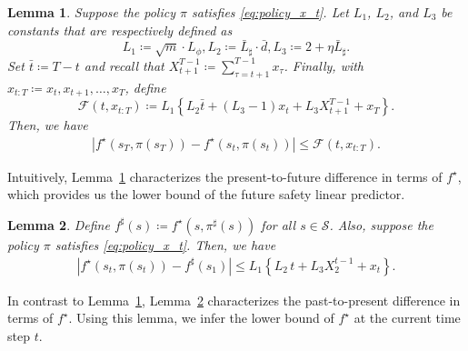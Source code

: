 \documentclass[letterpaper]{article} %
\newtheorem{lemma}
{Lemma}
\newcommand{\cS}{\mathcal{S}}
\newcommand{\abs}[1]{\left|{#1}\right|}
\begin{document}
\begin{lemma}
    \label{lemma:f_t_T}
    Suppose the policy $\pi$ satisfies \eqref{eq:policy_x_t}.
    Let $L_1$, $L_2$, and $L_3$ be constants that are respectively defined as 
    \[
        L_1 \coloneqq \sqrt{m} \cdot L_\phi, L_2 \coloneqq \bar{L}_\sharp \cdot \bar{d}, L_3 \coloneqq 2 + \eta \bar{L}_\sharp.
    \]
    Set $\bar{t} \coloneqq T - t$ and
    recall that $X_{t+1}^{T-1} \coloneqq \sum_{\tau=t+1}^{T-1} x_\tau$.
    Finally, with $x_{t:T} \coloneqq x_t, x_{t+1}, \ldots, x_T$, define
    \begin{equation*}
        \mathcal{F}(t, x_{t:T}) \coloneqq L_1 \left\{L_2 \bar{t} + (L_3-1) x_t + L_3 X_{t+1}^{T-1} + x_{T} \right\}.
    \end{equation*}
    Then, we have
    \begin{align*}
        \abs{f^\star(s_T, \pi(s_T)) - f^\star(s_t, \pi(s_t))}
        \le \mathcal{F}(t, x_{t:T}).
    \end{align*}
\end{lemma}
%
\noindent
Intuitively, Lemma~\ref{lemma:f_t_T} characterizes the present-to-future difference in terms of $f^\star$, which provides us the lower bound of the future safety linear predictor.
%
\begin{lemma}
    \label{lemma:f_1_t}
    Define $f^\sharp(s) \coloneqq f^\star(s, \pi^\sharp(s))$ for all $s \in \cS$.
    Also, suppose the policy $\pi$ satisfies \eqref{eq:policy_x_t}.
    Then, we have
    \begin{align*}
        \abs{f^\star(s_t, \pi(s_t)) - f^\sharp(s_1)}
        \le L_1 \left\{L_2 \, t + L_3 X_{2}^{t-1} + x_{t} \right\}.
    \end{align*}
\end{lemma}
%
\noindent
In contrast to Lemma~\ref{lemma:f_t_T}, Lemma~\ref{lemma:f_1_t} characterizes the past-to-present difference in terms of $f^\star$.
Using this lemma, we infer the lower bound of $f^\star$ at the current time step $t$.
\end{document}
